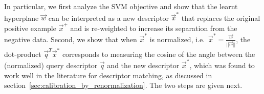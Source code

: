     In particular, we first analyze the SVM objective and show that the learnt hyperplane $\vec{w}$ can be interpreted as a new descriptor $\vec{x}^{*}$ that replaces the original positive example $\vec{x}^{+}$ and is re-weighted to increase its separation from the negative data. 
    Second, we show that when $\vec{x}^{*}$ is normalized, i.e.\  $\vec{x}^{*} = \frac{\vec{w}}{||\vec{w}||}$, the dot-product $\vec{q}^T\vec{x}^*$ corresponds to measuring the cosine of the angle between the (normalized) query descriptor $\vec{q}$  and the new descriptor $\vec{x}^{*}$, which was found to work well in the literature for descriptor matching, as discussed in section~\ref{sec:calibration_by_renormalization}. The two steps are given next.  
    


